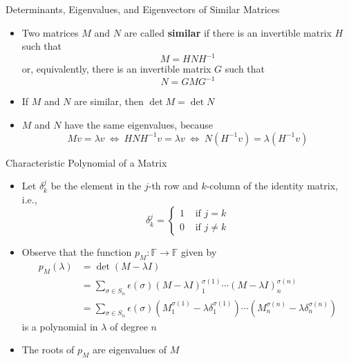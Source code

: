 \documentclass[usenames,dvipsnames,10pt]{beamer}
\newcommand\F{\mathbb{F}}
\begin{document}
\begin{frame}
  {Determinants, Eigenvalues, and Eigenvectors of Similar Matrices}

  \begin{itemize}
  \item Two matrices $M$ and $N$ are called {\bf similar} if there is an invertible matrix $H$ such that
    \[
      M = HNH^{-1}
    \]
    or, equivalently, there is an invertible matrix $G$ such that
    \[
      N = GMG^{-1}
    \]
  \item If $M$ and $N$ are similar, then $\det M = \det N$
  \item $M$ and $N$ have the same eigenvalues, because 
    \[
      Mv = \lambda v\ \iff\ HNH^{-1}v = \lambda v\ \iff\ N(H^{-1}v) = \lambda (H^{-1}v)
    \]
  \end{itemize}
\end{frame}

\begin{frame}
  {Characteristic Polynomial of a Matrix}

  \begin{itemize}
  \item Let $\delta^j_k$ be the element in the $j$-th row and $k$-column of the identity matrix, i.e.,
    \[
      \delta^j_k =
      \begin{cases}
        1 &\text{ if }j=k\\
        0 &\text{ if }j\ne k
      \end{cases}
    \]
  \item Observe that the function $p_M: \F \rightarrow \F$ given by
    \begin{align*}
      p_M(\lambda) &= \det (M-\lambda I)\\
                   &= \sum_{\sigma\in S_n} \epsilon(\sigma)(M-\lambda I)^{\sigma(1)}_1\cdots (M-\lambda I)^{\sigma(n)}_n\\
                   &= \sum_{\sigma\in S_n} \epsilon(\sigma)(M^{\sigma(1)}_1-\lambda \delta^{\sigma(1)}_1)\cdots (M^{\sigma(n)}_n-\lambda \delta^{\sigma(n)}_n)
    \end{align*}
    is a polynomial in $\lambda$ of degree $n$
  \item The roots of $p_M$ are eigenvalues of $M$
  \end{itemize}
\end{frame}
\end{document}
